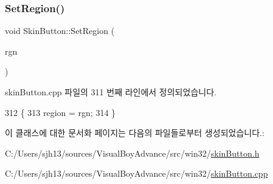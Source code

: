 \subsubsection{\texorpdfstring{Set\+Region()}{SetRegion()}}
{\footnotesize\ttfamily void Skin\+Button\+::\+Set\+Region (\begin{DoxyParamCaption}\item[{H\+R\+GN}]{rgn }\end{DoxyParamCaption})}



skin\+Button.\+cpp 파일의 311 번째 라인에서 정의되었습니다.


\begin{DoxyCode}
312 \{
313   region = rgn;
314 \}
\end{DoxyCode}


이 클래스에 대한 문서화 페이지는 다음의 파일들로부터 생성되었습니다.\+:\begin{DoxyCompactItemize}
\item 
C\+:/\+Users/sjh13/sources/\+Visual\+Boy\+Advance/src/win32/\mbox{\hyperlink{skin_button_8h}{skin\+Button.\+h}}\item 
C\+:/\+Users/sjh13/sources/\+Visual\+Boy\+Advance/src/win32/\mbox{\hyperlink{skin_button_8cpp}{skin\+Button.\+cpp}}\end{DoxyCompactItemize}
